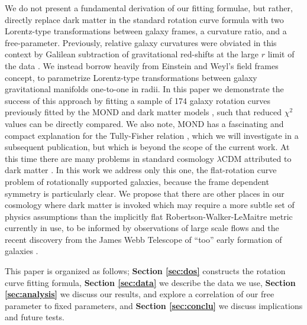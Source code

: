 \documentclass[reprint,%
 amsmath,amssymb,
 aps,
]{revtex4-1}
\begin{document}
     We do not present a fundamental derivation of our fitting formulae, but rather, directly replace dark matter in the standard rotation curve formula with  two Lorentz-type transformations  between galaxy frames, a curvature ratio, and a free-parameter.  Previously,
   relative galaxy curvatures    were    obviated in this context 
       by  Galilean subtraction of   gravitational red-shifts at the  large $r$  limit of the data \citep{MTW}. 
       We   
      instead   borrow heavily from Einstein and Weyl's field frames concept, to parametrize   Lorentz-type transformations     between galaxy gravitational manifolds one-to-one in radii. 
      In this paper we demonstrate the success of this approach by fitting   a sample of 174 galaxy rotation curves previously fitted by the MOND and dark matter models  \cite{McGaugh2016RAR,2016Lelli}, such that reduced $\chi^2$ values can be directly compared.  
      We also note,   MOND   has a fascinating and compact explanation for the 
   Tully-Fisher relation \cite{1977A&A....54..661T,McGaugh_2000}, which we will investigate in a subsequent publication,  but which is   beyond the scope of the current work. 
   At this time there are many problems in   standard  cosmology  $\lambda$CDM   attributed to dark matter \cite{2010dmp..book.....S}. In
 this work we address only this one,   the flat-rotation curve problem of rotationally supported galaxies,   because  the  frame dependent symmetry   is particularly clear.
 We propose   that there are other places in our cosmology where dark matter is invoked which   may require a  more subtle set of  physics assumptions than    the implicitly flat Robertson-Walker-LeMaitre      metric currently in use, to be informed by observations of large scale flows \cite{Tully:2014gfa} and the recent discovery from the James Webb Telescope of ``too'' early   formation of galaxies \cite{Naidu_2022}. 
   
   
      
  
 
 
 
This paper  is organized as follows;
{\bf Section \ref{sec:dos}} constructs  the rotation curve  fitting formula, 
{\bf Section \ref{sec:data}} we describe  the data we use, 
 {\bf Section \ref{sec:analysis}} we  discuss our results, and explore a correlation of our free parameter to fixed parameters, 
 and  {\bf Section \ref{sec:conclu}} we discuss implications and future tests.   
  
\end{document}
